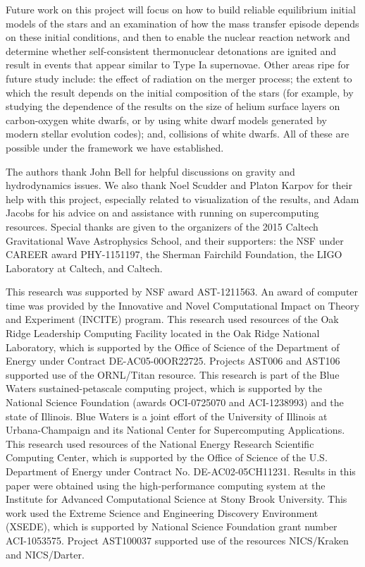 \documentclass[iop,numberedappendix]{../emulateapj}
\begin{document}
Future work on this project will focus on how to build 
reliable equilibrium initial models of the stars and 
an examination of how the mass transfer episode depends on 
these initial conditions, and then to enable the nuclear 
reaction network and determine whether self-consistent 
thermonuclear detonations are ignited and result in 
events that appear similar to Type Ia supernovae. Other 
areas ripe for future study include: the effect of radiation 
on the merger process; the extent to which the result 
depends on the initial composition of the stars (for example, 
by studying the dependence of the results on the size of helium 
surface layers on carbon-oxygen white dwarfs, or by using 
white dwarf models generated by modern stellar evolution 
codes); and, collisions of white dwarfs. All of 
these are possible under the framework we have established.

\acknowledgments

The authors thank John Bell for helpful discussions on gravity 
and hydrodynamics issues. We also thank Noel Scudder and Platon Karpov 
for their help with this project, especially related to visualization of the results, 
and Adam Jacobs for his advice on and assistance with 
running on supercomputing resources. Special thanks are given 
to the organizers of the 2015 Caltech Gravitational Wave 
Astrophysics School, and their supporters: the NSF 
under CAREER award PHY-1151197, the Sherman Fairchild 
Foundation, the LIGO Laboratory at Caltech, and Caltech.

This research was supported by NSF award AST-1211563. An
award of computer time was provided by the Innovative and Novel
Computational Impact on Theory and Experiment (INCITE) program.  This
research used resources of the Oak Ridge Leadership Computing Facility
located in the Oak Ridge National Laboratory, which is supported by
the Office of Science of the Department of Energy under Contract
DE-AC05-00OR22725. Projects AST006 and AST106 supported use of the ORNL/Titan resource. 
This research is part of the Blue Waters sustained-petascale computing project, 
which is supported by the National Science Foundation (awards OCI-0725070 
and ACI-1238993) and the state of Illinois. Blue Waters is a joint 
effort of the University of Illinois at Urbana-Champaign and its 
National Center for Supercomputing Applications.
This research used resources of the National Energy Research Scientific Computing
Center, which is supported by the Office of Science of the
U.S. Department of Energy under Contract No. DE-AC02-05CH11231.
Results in this paper were obtained using the high-performance
computing system at the Institute for Advanced Computational Science
at Stony Brook University.
This work used the Extreme Science and Engineering Discovery Environment (XSEDE), 
which is supported by National Science Foundation grant number ACI-1053575. 
Project AST100037 supported use of the resources NICS/Kraken and NICS/Darter.
\end{document}
